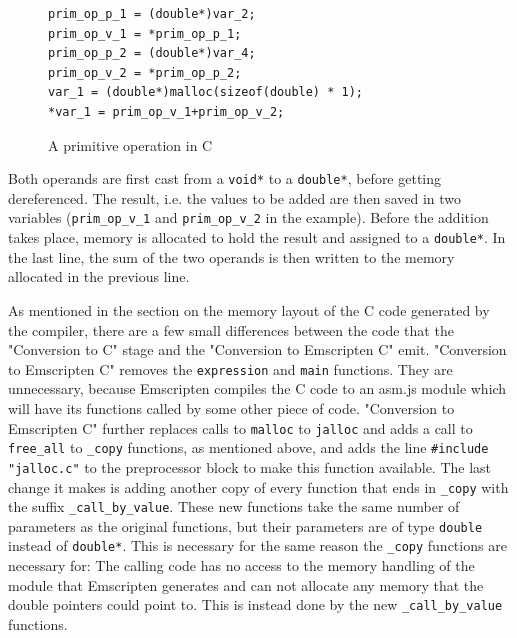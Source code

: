 \documentclass[11pt]{report}
\begin{document}
\begin{figure}[ht]
\begin{lstlisting}
prim_op_p_1 = (double*)var_2;
prim_op_v_1 = *prim_op_p_1;
prim_op_p_2 = (double*)var_4;
prim_op_v_2 = *prim_op_p_2;
var_1 = (double*)malloc(sizeof(double) * 1);
*var_1 = prim_op_v_1+prim_op_v_2;
\end{lstlisting}
\caption{A primitive operation in C}
\label{icmm6}
\end{figure}

Both operands are first cast from a \texttt{void*} to a \texttt{double*}, before getting dereferenced. The result, i.e. the values to be added are then saved in two variables (\texttt{prim_op_v_1} and \texttt{prim_op_v_2} in the example). Before the addition takes place, memory is allocated to hold the result and assigned to a \texttt{double*}. In the last line, the sum of the two operands is then written to the memory allocated in the previous line.

As mentioned in the section on the memory layout of the C code generated by the compiler, there are a few small differences between the code that the "Conversion to C" stage and the "Conversion to Emscripten C" emit. "Conversion to Emscripten C" removes the \texttt{expression} and \texttt{main} functions. They are unnecessary, because Emscripten compiles the C code to an asm.js module which will have its functions called by some other piece of code. "Conversion to Emscripten C" further replaces calls to \texttt{malloc} to \texttt{jalloc} and adds a call to \texttt{free_all} to \texttt{_copy} functions, as mentioned above, and adds the line \texttt{\#include "jalloc.c"} to the preprocessor block to make this function available. The last change it makes is adding another copy of every function that ends in \texttt{_copy} with the suffix \texttt{_call_by_value}. These new functions take the same number of parameters as the original functions, but their parameters are of type \texttt{double} instead of \texttt{double*}. This is necessary for the same reason the \texttt{_copy} functions are necessary for: The calling code has no access to the memory handling of the module that Emscripten generates and can not allocate any memory that the double pointers could point to. This is instead done by the new \texttt{_call_by_value} functions.

\end{document}
